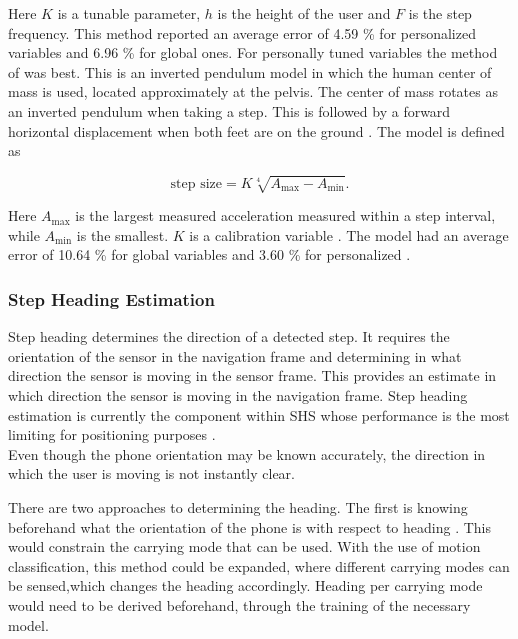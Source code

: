 Here $K$ is a tunable parameter, $h$ is the height of the user and $F$ is the step frequency. This method reported an average error of  4.59 \% for personalized variables and 6.96 \% for global ones. For personally tuned variables the method of \cite{Weinberg2002} was best. This is an inverted pendulum model in which the human center of mass is used, located approximately at the pelvis. The center of mass rotates as an inverted pendulum when taking a step. This is followed by a forward horizontal displacement when both feet are on the ground \cite{Diez2018}. The model is defined as 

\begin{equation}
\text{step size} =K \sqrt[4]{A_{\max }-A_{\min }}.
\label{eq:weinberg_stepsize}
\end{equation}

Here $A_{\max}$ is the largest measured acceleration measured within a step interval, while $A_{\min}$ is the smallest. $K$ is a calibration variable  \cite{Weinberg2002,Diez2018}. The model had an average error of  10.64 \% for global variables and  3.60 \% for personalized \cite{Vezocnik2019}.



\subsubsection{Step Heading Estimation}
Step heading determines the direction of a detected step. It requires the orientation of the sensor in the navigation frame and determining in what direction the sensor is moving in the sensor frame. This provides an estimate in which direction the sensor is moving in the navigation frame.  Step heading estimation is currently the component within SHS whose performance is the most limiting for positioning purposes \cite{Diez2018b, Qian2013,Combettes2017}.\\
Even though the phone orientation may be known accurately, the direction in which the user is moving is not instantly clear. \par
There are two approaches to determining the heading. The first is knowing beforehand what the orientation of the phone is with respect to heading \cite{Tian2016}.  This would constrain the carrying mode that can be used.  With the use of motion classification, this method could be expanded, where different carrying modes can be sensed,which changes the heading accordingly. Heading per carrying mode would need to be derived beforehand, through the training of the necessary model. 

